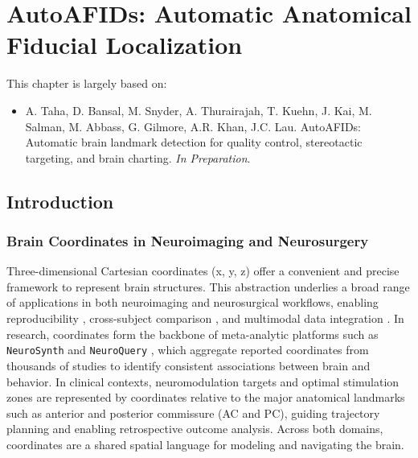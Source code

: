\chapter{AutoAFIDs: Automatic Anatomical Fiducial Localization} \label{chap:AutoAFIDs}
\newpage
\sloppy
This chapter is largely based on:
\begin{itemize}[noitemsep,topsep=0pt]
    \item {\small A. Taha, D. Bansal, M. Snyder, A. Thurairajah, T. Kuehn, J. Kai, M. Salman, M. Abbass, G. Gilmore, A.R. Khan, J.C. Lau.} AutoAFIDs: Automatic brain landmark detection for quality control, stereotactic targeting, and brain charting. \textit{In Preparation}.
\end{itemize}


\section{Introduction}
\subsection{Brain Coordinates in Neuroimaging and Neurosurgery}
Three-dimensional Cartesian coordinates (x, y, z) offer a convenient and precise framework to represent brain structures. This abstraction underlies a broad range of applications in both neuroimaging and neurosurgical workflows, enabling reproducibility \cite{Dockes2020-nw}, cross-subject comparison \cite{Glasser2016-ko}, and multimodal data integration \cite{Uludag2014-qz}. In research, coordinates form the backbone of meta-analytic platforms such as \texttt{NeuroSynth} \cite{Yarkoni2011-sr} and \texttt{NeuroQuery} \cite{Dockes2020-nw}, which aggregate reported coordinates from thousands of studies to identify consistent associations between brain and behavior. In clinical contexts, neuromodulation targets and optimal stimulation zones are represented by coordinates relative to the major anatomical landmarks \cite{Horn2017-bi} such as anterior and posterior commissure (AC and PC), guiding trajectory planning and enabling retrospective outcome analysis. Across both domains, coordinates are a shared spatial language for modeling and navigating the brain.

